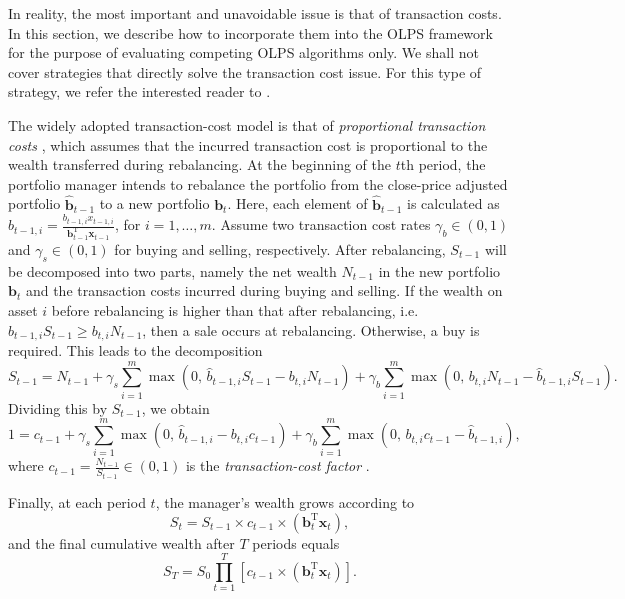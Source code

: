 In reality, the most important and unavoidable issue is that of transaction costs. In this section, we describe how to incorporate them into the OLPS framework for the purpose of evaluating competing OLPS algorithms only. We shall not cover strategies that directly solve the transaction cost issue. For this type of strategy, we refer the interested reader to \citep{davis90, iyengar00, akian01, schafer02, gyorfi08, ormos11}.

The widely adopted transaction-cost model is that of \emph{proportional transaction costs} \citep{blum99, gyorfi08}, which assumes that the incurred transaction cost is proportional to the wealth transferred during rebalancing. At the beginning of the $t$th period, the portfolio manager intends to rebalance the portfolio from the close-price adjusted portfolio $\widehat{\mathbf{b}}_{t-1}$ to a new portfolio $\mathbf{b}_t$. Here, each element of $\widehat{\mathbf{b}}_{t-1}$ is calculated as $\widehat{b}_{t-1,i} = \frac{b_{t-1,i}x_{t-1,i}}{\mathbf{b}_{t-1}^\text{T}\mathbf{x}_{t-1}}$, for $i=1,\ldots,m$. Assume two transaction cost rates $\gamma_b \in (0, 1)$ and $\gamma_s \in (0, 1)$ for buying and selling, respectively. After rebalancing, $S_{t-1}$ will be decomposed into two parts, namely the net wealth $N_{t-1}$ in the new portfolio $\mathbf{b}_t$ and the transaction costs incurred during buying and selling. If the wealth on asset $i$ before rebalancing is higher than that after rebalancing, i.e.\ $\widehat{b}_{t-1,i} S_{t-1} \geq b_{t,i}N_{t-1}$, then a sale occurs at rebalancing. Otherwise, a buy is required. This leads to the decomposition
\begin{equation}
	S_{t-1}
	= N_{t-1} + \gamma_s \sum_{i=1}^m \max(0, \, \widehat{b}_{t-1,i} S_{t-1} - b_{t,i}N_{t-1}) + \gamma_b \sum_{i=1}^m \max(0, \, b_{t,i}N_{t-1} - \widehat{b}_{t-1,i} S_{t-1}).
\end{equation}
Dividing this by $S_{t-1}$, we obtain
\begin{equation}
	1
	= c_{t-1} + \gamma_s \sum_{i=1}^m \max(0, \, \widehat{b}_{t-1,i} - b_{t,i}c_{t-1}) + \gamma_b \sum_{i=1}^m \max(0, \, b_{t,i}c_{t-1} - \widehat{b}_{t-1,i}),
\end{equation}
where $c_{t-1} = \frac{N_{t-1}}{S_{t-1}} \in (0, 1)$ is the \emph{transaction-cost factor} \citep{gyorfi08}.

Finally, at each period $t$, the manager's wealth grows according to
\begin{equation}
	S_t = S_{t-1} \times c_{t-1} \times (\mathbf{b}_t^\text{T}\mathbf{x}_t),
\end{equation}
and the final cumulative wealth after $T$ periods equals
\begin{equation}
	S_T = S_0 \prod_{t=1}^T [c_{t-1} \times (\mathbf{b}_t^\text{T}\mathbf{x}_t)].
\end{equation}





